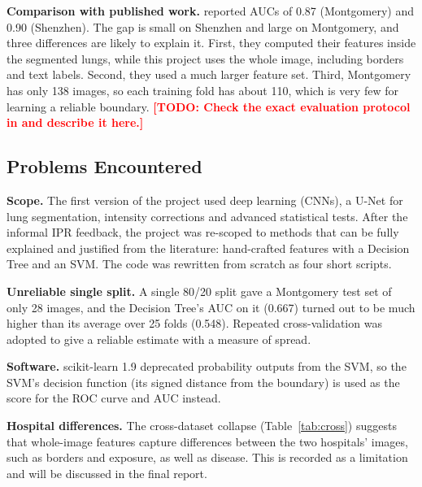 \documentclass[11pt,a4paper]{article}
\newcommand{\todo}[1]{\textcolor{red}{\textbf{[TODO: #1]}}}
\begin{document}
\noindent\textbf{Comparison with published work. }\citet{jaeger2014tmi} reported AUCs of 0.87 (Montgomery) and 0.90 (Shenzhen). The gap is small on Shenzhen and large on Montgomery, and three differences are likely to explain it. First, they computed their features inside the segmented lungs, while this project uses the whole image, including borders and text labels. Second, they used a much larger feature set. Third, Montgomery has only 138 images, so each training fold has about 110, which is very few for learning a reliable boundary. \todo{Check the exact evaluation protocol in \citet{jaeger2014tmi} and describe it here.}

\subsection{Problems Encountered}
\noindent\textbf{Scope. }The first version of the project used deep learning (CNNs), a U-Net for lung segmentation, intensity corrections and advanced statistical tests. After the informal IPR feedback, the project was re-scoped to methods that can be fully explained and justified from the literature: hand-crafted features with a Decision Tree and an SVM. The code was rewritten from scratch as four short scripts.

\noindent\textbf{Unreliable single split. }A single 80/20 split gave a Montgomery test set of only 28 images, and the Decision Tree's AUC on it (0.667) turned out to be much higher than its average over 25 folds (0.548). Repeated cross-validation was adopted to give a reliable estimate with a measure of spread.

\noindent\textbf{Software. }scikit-learn 1.9 deprecated probability outputs from the SVM, so the SVM's decision function (its signed distance from the boundary) is used as the score for the ROC curve and AUC instead.

\noindent\textbf{Hospital differences. }The cross-dataset collapse (Table~\ref{tab:cross}) suggests that whole-image features capture differences between the two hospitals' images, such as borders and exposure, as well as disease. This is recorded as a limitation and will be discussed in the final report.
\end{document}
